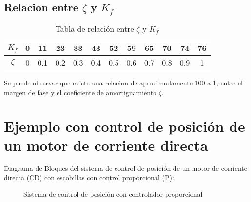 \documentclass{article}          %
\begin{document}
        \subsection{Relacion entre $\zeta$ y $K_f$}
            \begin{table}[h]
                \centering
                \begin{tabular}{c c c c c c c c c c c c}
                    \hline
                    $K_f$ & 0 & 11 & 23 & 33 & 43 & 52 & 59 & 65 & 70 & 74 & 76 \\
                    \hline
                    $\zeta$ & 0 & 0.1 & 0.2 & 0.3 & 0.4 & 0.5 & 0.6 & 0.7 & 0.8 & 0.9 & 1 \\
                \end{tabular}
                \caption{ Tabla de relación entre $\zeta$ y $K_f$ }
            \end{table}
            Se puede observar que existe una relacion de aproximadamente 100 a 1, entre el margen de fase y el coeficiente de amortiguamiento $\zeta$.
    
    \section{Ejemplo con control de posición de un motor de corriente directa}

        Diagrama de Bloques del sistema de control de posición de un motor de corriente directa (CD) con escobillas con control proporcional (P):

        \begin{figure}[H]
            \centering

            \caption{Sistema de control de posición con controlador proporcional}
        \end{figure}
\end{document}
